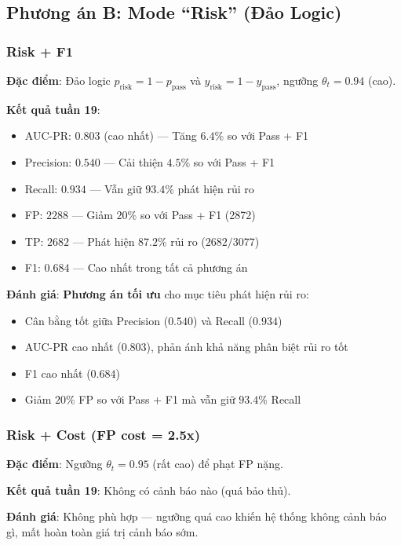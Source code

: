 \documentclass[12pt,a4paper]{article}
\begin{document}
\subsection{Phương án B: Mode ``Risk'' (Đảo Logic)}

\subsubsection{Risk + F1}
\textbf{Đặc điểm}: Đảo logic $p_{\text{risk}} = 1 - p_{\text{pass}}$ và $y_{\text{risk}} = 1 - y_{\text{pass}}$, ngưỡng $\theta_t = 0.94$ (cao).

\textbf{Kết quả tuần 19}:
\begin{itemize}
    \item AUC-PR: $0.803$ (cao nhất) --- Tăng $6.4\%$ so với Pass + F1
    \item Precision: $0.540$ --- Cải thiện $4.5\%$ so với Pass + F1
    \item Recall: $0.934$ --- Vẫn giữ $93.4\%$ phát hiện rủi ro
    \item FP: $2288$ --- Giảm $20\%$ so với Pass + F1 (2872)
    \item TP: $2682$ --- Phát hiện $87.2\%$ rủi ro ($2682/3077$)
    \item F1: $0.684$ --- Cao nhất trong tất cả phương án
\end{itemize}

\textbf{Đánh giá}: \textbf{Phương án tối ưu} cho mục tiêu phát hiện rủi ro:
\begin{itemize}
    \item Cân bằng tốt giữa Precision ($0.540$) và Recall ($0.934$)
    \item AUC-PR cao nhất ($0.803$), phản ánh khả năng phân biệt rủi ro tốt
    \item F1 cao nhất ($0.684$)
    \item Giảm $20\%$ FP so với Pass + F1 mà vẫn giữ $93.4\%$ Recall
\end{itemize}

\subsubsection{Risk + Cost (FP cost = 2.5x)}
\textbf{Đặc điểm}: Ngưỡng $\theta_t = 0.95$ (rất cao) để phạt FP nặng.

\textbf{Kết quả tuần 19}: Không có cảnh báo nào (quá bảo thủ).

\textbf{Đánh giá}: Không phù hợp --- ngưỡng quá cao khiến hệ thống không cảnh báo gì, mất hoàn toàn giá trị cảnh báo sớm.
\end{document}
